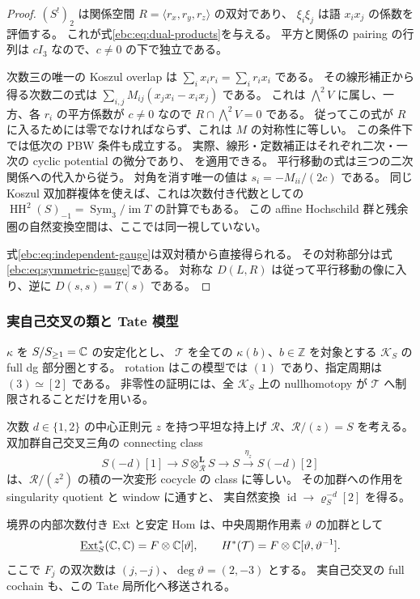 \begin{proof}
$(S^!)_2$ は関係空間 $R=\langle r_x,r_y,r_z\rangle$ の双対であり、
$\xi_i\xi_j$ は語 $x_ix_j$ の係数を評価する。
これが式\eqref{ebc:eq:dual-products}を与える。
平方と関係の pairing の行列は $cI_3$ なので、$c\ne0$ の下で独立である。

次数三の唯一の Koszul overlap は
$\sum_i x_ir_i=\sum_i r_ix_i$ である。
その線形補正から得る次数二の式は
$\sum_{i,j}M_{ij}(x_jx_i-x_ix_j)$ である。
これは $\bigwedge^2V$ に属し、一方、各 $r_i$ の平方係数が $c\ne0$ なので
$R\cap\bigwedge^2V=0$ である。
従ってこの式が $R$ に入るためには零でなければならず、これは $M$ の対称性に等しい。
この条件下では低次の PBW 条件も成立する。
実際、線形・定数補正はそれぞれ二次・一次の cyclic potential の微分であり、
\cite[Theorem~3.1]{NFMBeTa}を適用できる。
平行移動の式は三つの二次関係への代入から従う。
対角を消す唯一の値は $s_i=-M_{ii}/(2c)$ である。
同じ Koszul 双加群複体を使えば、これは次数付き代数としての
$\operatorname{HH}^2(S)_{-1}=\operatorname{Sym}_3/\operatorname{im}T$ の計算でもある。
この affine Hochschild 群と残余圏の自然変換空間は、ここでは同一視していない。

式\eqref{ebc:eq:independent-gauge}は双対積から直接得られる。
その対称部分は式\eqref{ebc:eq:symmetric-gauge}である。
対称な $D(L,R)$ は従って平行移動の像に入り、逆に $D(s,s)=T(s)$ である。
\end{proof}

\subsubsection{実自己交叉の類と Tate 模型}

$\kappa$ を $S/S_{\ge1}=\mathbb C$ の安定化とし、
$\mathcal T$ を全ての $\kappa(b)$、$b\in\mathbb Z$ を対象とする
$\mathcal K_S$ の full dg 部分圏とする。
rotation はこの模型では $(1)$ であり、指定周期は $(3)\simeq[2]$ である。
非零性の証明には、全 $\mathcal K_S$ 上の nullhomotopy が
$\mathcal T$ へ制限されることだけを用いる。

\begin{lemma}
\label{ebc:lem:full-tate}
次数 $d\in\{1,2\}$ の中心正則元 $z$ を持つ平坦な持上げ
$\mathcal R$、$\mathcal R/(z)=S$ を考える。
双加群自己交叉三角の connecting class
\begin{equation}\label{ebc:eq:self-intersection}
 S(-d)[1]\longrightarrow S\otimes_{\mathcal R}^{\mathbf L}S
 \longrightarrow S\xrightarrow{\eta_z}S(-d)[2]
\end{equation}
は、$\mathcal R/(z^2)$ の積の一次変形 cocycle の class に等しい。
その加群への作用を singularity quotient と window に通すと、
実自然変換 $\operatorname{id}\to\varrho_S^{-d}[2]$ を得る。

境界の内部次数付き Ext と安定 Hom は、中央周期作用素 $\vartheta$ の加群として
\begin{equation}\label{ebc:eq:tate-module}
 \underline{\operatorname{Ext}}_S^*(\mathbb C,\mathbb C)
     =F\otimes\mathbb C[\vartheta],\qquad
 H^*(\mathcal T)=F\otimes\mathbb C[\vartheta,\vartheta^{-1}].
\end{equation}
ここで $F_j$ の双次数は $(j,-j)$、$\deg\vartheta=(2,-3)$ とする。
実自己交叉の full cochain も、この Tate 局所化へ移送される。
\end{lemma}

